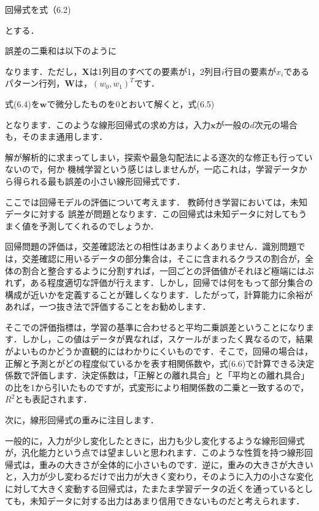 回帰式を式（6.2)


とする．


誤差の二乗和は以下のように


なります．ただし，$\bm{X}$は1列目のすべての要素が1，2列目$i$行目の要素が$x_i$であるパターン行列，$\bm{W}$は，$(w_0, w_1)^T$です．

式(6.4)を$\bm{w}$で微分したものを$0$とおいて解くと，式(6.5)


となります．このような線形回帰式の求め方は，入力$\bm{x}$が一般の$d$次元の場合も，そのまま通用します．

解が解析的に求まってしまい，探索や最急勾配法による逐次的な修正も行っていないので，何か
機械学習という感じはしませんが，一応これは，学習データから得られる最も誤差の小さい線形回帰式です．


ここでは回帰モデルの評価について考えます．
教師付き学習においては，未知データに対する
誤差が問題となります．この回帰式は未知データに対してもうまく値を予測してくれるのでしょうか．

回帰問題の評価は，交差確認法との相性はあまりよくありません．識別問題では，交差確認に用いるデータの部分集合は，そこに含まれるクラスの割合が，全体の割合と整合するように分割すれば，一回ごとの評価値がそれほど極端にはぶれず，ある程度適切な評価が行えます．しかし，回帰では何をもって部分集合の構成が近いかを定義することが難しくなります．したがって，計算能力に余裕があれば，一つ抜き法で評価することをお勧めします．

そこでの評価指標は，学習の基準に合わせると平均二乗誤差ということになります．しかし，この値はデータが異なれば，スケールがまったく異なるので，結果がよいものかどうか直観的にはわかりにくいものです．そこで，回帰の場合は，正解と予測とがどの程度似ているかを表す相関係数や，式(6.6)で計算できる決定係数で評価します．決定係数は，「正解との離れ具合」と「平均との離れ具合」の比を1から引いたものですが，式変形により相関係数の二乗と一致するので，$R^2$とも表記されます．



次に，線形回帰式の重みに注目します．

一般的に，入力が少し変化したときに，出力も少し変化するような線形回帰式が，汎化能力という点では望ましいと思われます．このような性質を持つ線形回帰式は，重みの大きさが全体的に小さいものです．逆に，重みの大きさが大きいと，入力が少し変わるだけで出力が大きく変わり，そのように入力の小さな変化に対して大きく変動する回帰式は，たまたま学習データの近くを通っているとしても，未知データに対する出力はあまり信用できないものだと考えられます．

